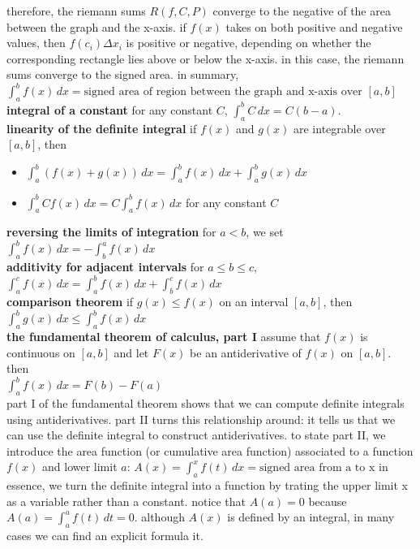 \documentclass{article}
\begin{document}
therefore, the riemann sums $R(f, C, P)$ converge to the negative of the area between the graph and the x-axis. if $f(x)$ takes on both positive and negative values, then $f(c_i)\Delta x_i$ is positive or negative, depending on whether the corresponding rectangle lies above or below the x-axis. in this case, the riemann sums converge to the signed area. in summary,\\
$\int_{a}^{b}f(x)\, dx = \text{signed area of region between the graph and x-axis over } [a, b]$\\

\textbf{integral of a constant} for any constant $C$, $\int_{a}^{b}C\,dx = C(b - a)$.\\

\textbf{linearity of the definite integral} if $f(x)$ and $g(x)$ are integrable over $[a, b]$, then
	\begin{itemize}
		\item $\int_{a}^{b}(f(x) + g(x))\,dx = \int_{a}^{b}f(x)\,dx + \int_{a}^{b}g(x)\,dx$
		\item $\int_{a}^{b}Cf(x)\,dx = C\int_{a}^{b}f(x)\,dx$ for any constant $C$
	\end{itemize}

\textbf{reversing the limits of integration} for $a < b$, we set $\int_{a}^{b}f(x)\,dx = -\int_{b}^{a}f(x)\,dx$\\

\textbf{additivity for adjacent intervals} for $a \leq b \leq c$,\\
$ \int_{a}^{c}f(x)\,dx  = \int_{a}^{b}f(x)\,dx + \int_{b}^{c}f(x)\,dx$\\

\textbf{comparison theorem} if $g(x) \leq f(x)$ on an interval $[a, b]$, then\\
$\int_{a}^{b}g(x)\,dx \leq \int_{a}^{b}f(x)\,dx$\\

\textbf{the fundamental theorem of calculus, part I} assume that $f(x)$ is continuous on $[a, b]$ and let $F(x)$ be an antiderivative of $f(x)$ on $[a, b]$. then\\
$\int_{a}^{b}f(x)\,dx = F(b) - F(a)$\\

part I of the fundamental theorem shows that we can compute definite integrals using antiderivatives. part II turns this relationship around: it tells us that we can use the definite integral to construct antiderivatives. to state part II, we introduce the area function (or cumulative area function) associated to a function $f(x)$ and lower limit $a$: $A(x) = \int_{a}^{x}f(t)\, dx = \text{signed area from a to x}$ in essence, we turn the definite integral into a function by trating the upper limit x as a variable rather than a constant. notice that $A(a) = 0$ because $A(a) = \int_{a}^{a}f(t)\,dt = 0$. although $A(x)$ is defined by an integral, in many cases we can find an explicit formula it.\\
\end{document}
